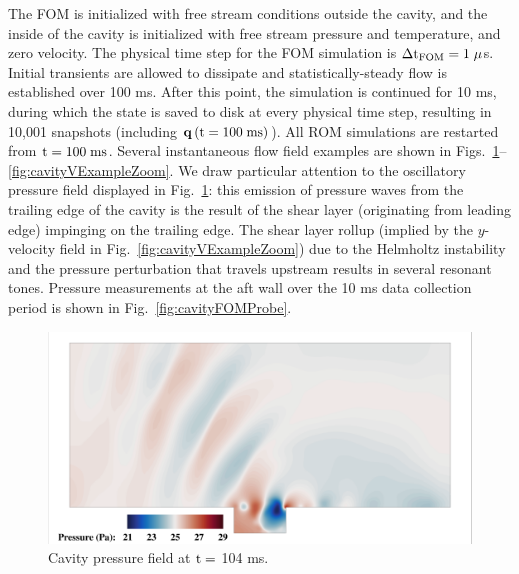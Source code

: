 The FOM is initialized with free stream conditions outside the cavity, and the inside of the cavity is initialized with free stream pressure and temperature, and zero velocity. The physical time step for the FOM simulation is $\Delta \text{t}_{\text{FOM}} = 1 \;\mu$s. Initial transients are allowed to dissipate and statistically-steady flow is established over 100 ms. After this point, the simulation is continued for 10 ms, during which the state is saved to disk at every physical time step, resulting in 10,001 snapshots (including $\mathbf{q}\left(\text{t} = 100 \; \text{ms}\right)$). All ROM simulations are restarted from $\text{t} = 100 \; \text{ms}$. Several instantaneous flow field examples are shown in Figs.~\ref{fig:cavityPressExample}--\ref{fig:cavityVExampleZoom}. We draw particular attention to the oscillatory pressure field displayed in Fig.~\ref{fig:cavityPressExample}: this emission of pressure waves from the trailing edge of the cavity is the result of the shear layer (originating from leading edge) impinging on the trailing edge. The shear layer rollup (implied by the $y$-velocity field in Fig.~\ref{fig:cavityVExampleZoom}) due to the Helmholtz instability and the pressure perturbation that travels upstream results in several resonant tones. Pressure measurements at the aft wall over the 10 ms data collection period is shown in Fig.~\ref{fig:cavityFOMProbe}.

\begin{figure}
	\centering
	\includegraphics[width=0.9\linewidth,trim={0.5em 0.5em 0.5em 0.5em},clip]{Chapters/CavityAndCVRC/Images/cavity/pressure_example_full.png}
	\caption{\label{fig:cavityPressExample}Cavity pressure field at $\text{t} =$ 104 ms.}
\end{figure}

